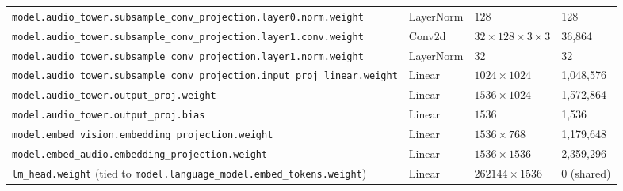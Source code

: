 \documentclass[10pt,a4paper]{article}
\theoremstyle{definition}
\begin{document}
\begin{longtable}{p{6.9cm}>{\raggedright\arraybackslash}p{3.4cm}ll}
\texttt{model.\allowbreak{}audio\_tower.\allowbreak{}subsample\_conv\_projection.\allowbreak{}layer0.\allowbreak{}norm.\allowbreak{}weight} & Layer\allowbreak{}Norm & $128$ & 128 \\
\texttt{model.\allowbreak{}audio\_tower.\allowbreak{}subsample\_conv\_projection.\allowbreak{}layer1.\allowbreak{}conv.\allowbreak{}weight} & Conv2d & $32 \times 128 \times 3 \times 3$ & 36,864 \\
\texttt{model.\allowbreak{}audio\_tower.\allowbreak{}subsample\_conv\_projection.\allowbreak{}layer1.\allowbreak{}norm.\allowbreak{}weight} & Layer\allowbreak{}Norm & $32$ & 32 \\
\texttt{model.\allowbreak{}audio\_tower.\allowbreak{}subsample\_conv\_projection.\allowbreak{}input\_proj\_linear.\allowbreak{}weight} & Linear & $1024 \times 1024$ & 1,048,576 \\
\texttt{model.\allowbreak{}audio\_tower.\allowbreak{}output\_proj.\allowbreak{}weight} & Linear & $1536 \times 1024$ & 1,572,864 \\
\texttt{model.\allowbreak{}audio\_tower.\allowbreak{}output\_proj.\allowbreak{}bias} & Linear & $1536$ & 1,536 \\
\texttt{model.\allowbreak{}embed\_vision.\allowbreak{}embedding\_projection.\allowbreak{}weight} & Linear & $1536 \times 768$ & 1,179,648 \\
\texttt{model.\allowbreak{}embed\_audio.\allowbreak{}embedding\_projection.\allowbreak{}weight} & Linear & $1536 \times 1536$ & 2,359,296 \\
\texttt{lm\_head.\allowbreak{}weight} (tied to \texttt{model.\allowbreak{}language\_model.\allowbreak{}embed\_tokens.\allowbreak{}weight}) & Linear & $262144 \times 1536$ & 0 (shared) \\
\end{longtable}
\end{document}
